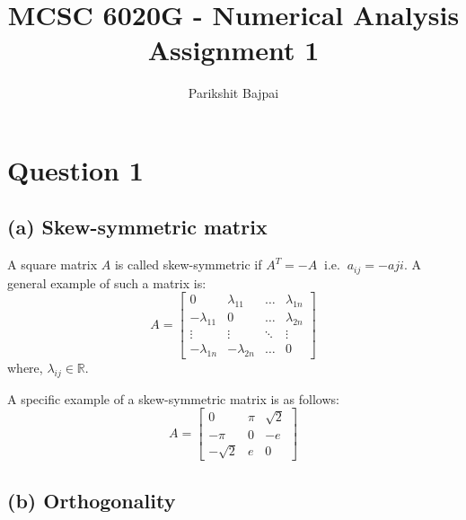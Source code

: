 \documentclass[11pt, oneside]{article}
\title{MCSC 6020G - Numerical Analysis \\
        \Large Assignment 1}
\author{Parikshit Bajpai}
\date{}
\begin{document}
\maketitle

\section*{Question 1}
\subsection*{(a) Skew-symmetric matrix}

  A square matrix $A$ is called skew-symmetric if $A^T = -A \;\; \text{i.e.} \;\; a_{ij}=-a{ji}$. A general example of such a matrix is:
  \begin{equation*}
      A=
      \begin{bmatrix}
        0              & \lambda_{11}  & \dots   & \lambda_{1n} \\
        -\lambda_{11}  & 0             & \dots   & \lambda_{2n} \\
        \vdots         & \vdots        & \ddots  & \vdots \\
        -\lambda_{1n}  & -\lambda_{2n} & \dots   & 0
      \end{bmatrix}
  \end{equation*}
  where, $\lambda_{ij} \in \mathbb{R}$.

  A specific example of a skew-symmetric matrix is as follows:
  \begin{equation*}
    A=
    \begin{bmatrix}
      0              & \pi        & \sqrt{2} \\
      -\pi           & 0          & -e \\
      -\sqrt{2}      & e          & 0
    \end{bmatrix}
  \end{equation*}

\subsection*{(b) Orthogonality}
\end{document}
